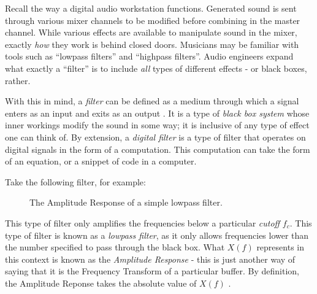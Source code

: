 Recall the way a digital audio workstation functions. Generated sound is sent through various mixer channels to be modified before combining in the master channel. While various effects are available to manipulate sound in the mixer, exactly \textit{how} they work is behind closed doors. Musicians may be familiar with tools such as ``lowpass filters'' and ``highpass filters''. Audio engineers expand what exactly a ``filter'' is to include \textit{all} types of different effects - or black boxes, rather.

With this in mind, a \textit{filter} can be defined as a medium through which a signal enters as an input and exits as an output \cite{FILTERS07}. It is a type of \textit{black box system} whose inner workings modify the sound in some way; it is inclusive of any type of effect one can think of. By extension, a \textit{digital filter} is a type of filter that operates on digital signals in the form of a computation. This computation can take the form of an equation, or a snippet of code in a computer.

Take the following filter, for example:

\begin{figure}[h] %
	\begin{center}
		\caption{The Amplitude Response of a simple lowpass filter.}
	\end{center}
\end{figure}

This type of filter only amplifies the frequencies below a particular \textit{cutoff} $f_c$. This type of filter is known as a \textit{lowpass filter}, as it only allows frequencies lower than the number specified to pass through the black box. What $X(f)$ represents in this context is known as the \textit{Amplitude Response} - this is just another way of saying that it is the Frequency Transform of a particular buffer. By definition, the Amplitude Reponse takes the absolute value of $X(f)$ \cite{FILTERS07}.

